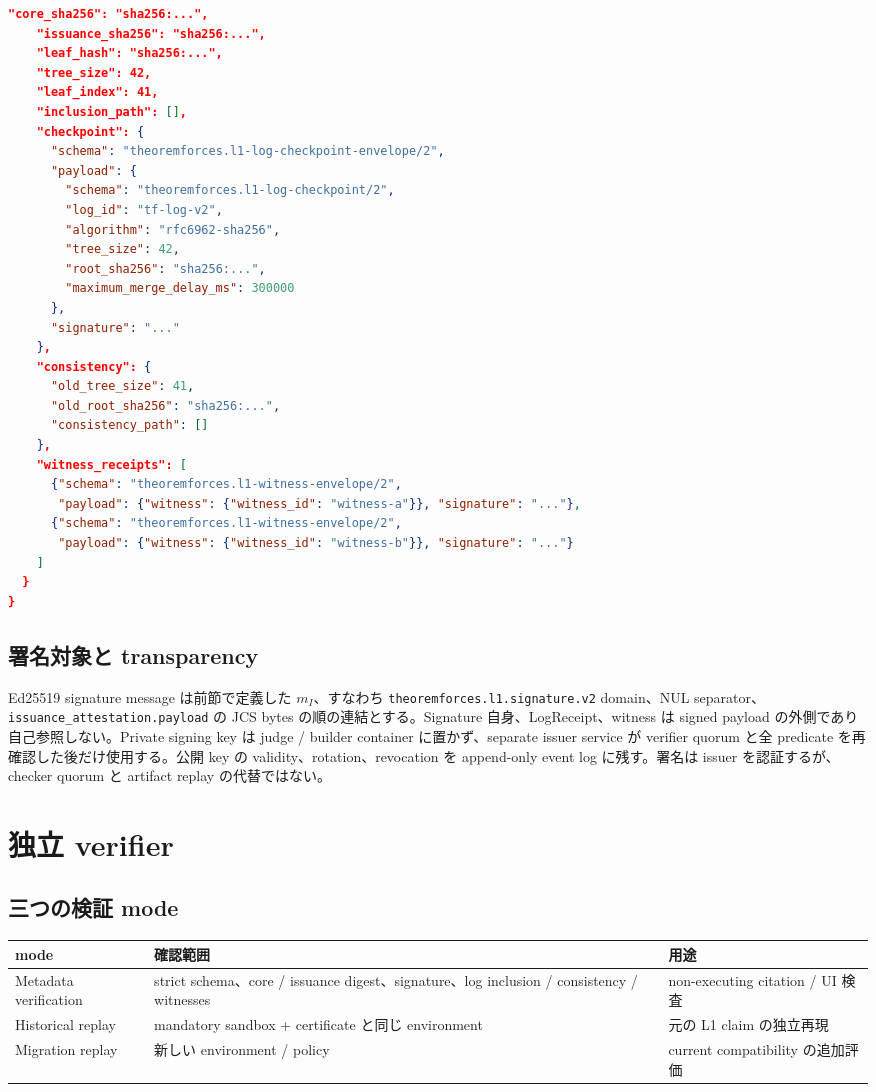 \documentclass[a4paper,11pt]{ltjsarticle}
\newcommand{\code}[1]{\texttt{#1}}
\begin{document}
\begin{lstlisting}[language=JSON,basicstyle=\ttfamily\scriptsize]
    "core_sha256": "sha256:...",
    "issuance_sha256": "sha256:...",
    "leaf_hash": "sha256:...",
    "tree_size": 42,
    "leaf_index": 41,
    "inclusion_path": [],
    "checkpoint": {
      "schema": "theoremforces.l1-log-checkpoint-envelope/2",
      "payload": {
        "schema": "theoremforces.l1-log-checkpoint/2",
        "log_id": "tf-log-v2",
        "algorithm": "rfc6962-sha256",
        "tree_size": 42,
        "root_sha256": "sha256:...",
        "maximum_merge_delay_ms": 300000
      },
      "signature": "..."
    },
    "consistency": {
      "old_tree_size": 41,
      "old_root_sha256": "sha256:...",
      "consistency_path": []
    },
    "witness_receipts": [
      {"schema": "theoremforces.l1-witness-envelope/2",
       "payload": {"witness": {"witness_id": "witness-a"}}, "signature": "..."},
      {"schema": "theoremforces.l1-witness-envelope/2",
       "payload": {"witness": {"witness_id": "witness-b"}}, "signature": "..."}
    ]
  }
}
\end{lstlisting}

\subsection{署名対象と transparency}

Ed25519 signature message は前節で定義した $m_I$、すなわち
\code{theoremforces.l1.signature.v2} domain、NUL separator、
\code{issuance\_attestation.payload} の JCS bytes の順の連結とする。Signature 自身、LogReceipt、witness は
signed payload の外側であり自己参照しない。Private signing key は judge / builder container に置かず、separate issuer
service が verifier quorum と全 predicate を再確認した後だけ使用する。公開 key の validity、rotation、revocation を
append-only event log に残す。署名は issuer を認証するが、checker quorum と artifact replay の代替ではない。

\section{独立 verifier}

\subsection{三つの検証 mode}

\begin{tabularx}{\linewidth}{L{34mm}L{33mm}Y}
\toprule
\textbf{mode} & \textbf{確認範囲} & \textbf{用途} \\
\midrule
Metadata verification & strict schema、core / issuance digest、signature、log inclusion / consistency / witnesses & non-executing citation / UI 検査 \\
Historical replay & mandatory sandbox + certificate と同じ environment & 元の L1 claim の独立再現 \\
Migration replay & 新しい environment / policy & current compatibility の追加評価 \\
\bottomrule
\end{tabularx}
\end{document}
